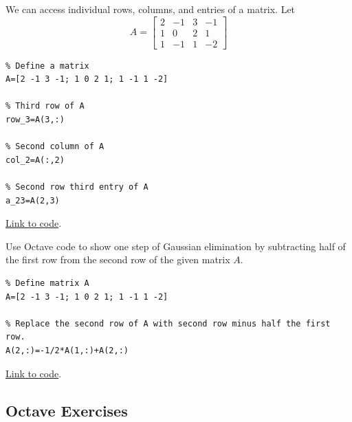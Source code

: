 \documentclass{ximera}
\begin{document}
\begin{template}\label{temp:matrixRowColEntry}
    We can access individual rows, columns, and entries of a matrix.  Let $$A=\begin{bmatrix}2 & -1 & 3 & -1\\1 & 0 & 2 & 1\\1 & -1 & 1 & -2\end{bmatrix}$$
\begin{verbatim}
% Define a matrix
A=[2 -1 3 -1; 1 0 2 1; 1 -1 1 -2]
 
% Third row of A
row_3=A(3,:)
 
% Second column of A
col_2=A(:,2)
 
% Second row third entry of A
a_23=A(2,3)  
\end{verbatim}
\href{https://sagecell.sagemath.org/?z=eJxVjEEKwjAURPeB3GE2BQsR7M-u0kXAG9SdSAhtigGbQIhYb-9v7cbNMDM8XoWLn0L0cJhdyWGBFKa7EY4NNMcZDU4gbIU_DrpLIUWF6yPkETm9kSYYKbhZ3ZmDVm39I3o_pDhiSM_XHHeKhyWmWkX_1Coqm9LHkj877iytTlK6_gIqSCuZ&lang=octave&interacts=eJyLjgUAARUAuQ==}{Link to code}.
\end{template}
 
\begin{example}\label{ex:gauss_octave}
Use Octave code to show one step of Gaussian elimination by subtracting half of the first row from the second row of the given matrix $A$.
\begin{explanation}
\begin{verbatim}
% Define matrix A
A=[2 -1 3 -1; 1 0 2 1; 1 -1 1 -2]
 
% Replace the second row of A with second row minus half the first row. 
A(2,:)=-1/2*A(1,:)+A(2,:) 
\end{verbatim}
 
\href{https://sagecell.sagemath.org/?z=eJxNjMsKwjAURPeB_MNsCvVRNXGndHHBL3ArLkK9IYE2kSRSP99YN26Gw5lhGlzY-sCYTEn-DZKC-ptGp3CscYbCARoLVFdD3yGFFA2u_BzNwCiOkXmI4YEUZ0QLwuyL-5eTD68MZ0a7zK1PuXyLHeoZtXp7WvWd2us1tary5qc-770qUw==&lang=octave&interacts=eJyLjgUAARUAuQ==}{Link to code}.
\end{explanation}
\end{example}
 
 
\subsection*{Octave Exercises}
 
\end{document}
